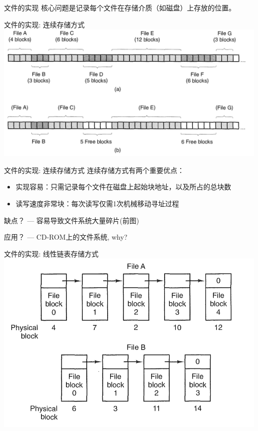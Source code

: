 \documentclass[xcolor=svgnames]{beamer}
\begin{document}
\begin{CJK*}{UTF8}{gbsn}
\begin{frame}{文件的实现}
\alert{核心问题}是记录每个文件在存储介质（如磁盘）上存放的位置。
\end{frame}

\begin{frame}{文件的实现: 连续存储方式}
\includegraphics[width=1.0\textwidth]{cont.png}
\end{frame}

\begin{frame}{文件的实现: 连续存储方式}
连续存储方式有两个重要优点：
\begin{itemize}
\item 实现容易：只需记录每个文件在磁盘上起始块地址，以及所占的总块数
\item 读写速度非常块：每次读写仅需1次机械移动寻址过程
\end{itemize}

\alert{缺点？} --- 容易导致文件系统大量碎片(前图)

\alert{应用？} --- CD-ROM上的文件系统, why?
\end{frame}

\begin{frame}{文件的实现: 线性链表存储方式}
\includegraphics[width=1.0\textwidth]{linked.png}


\end{frame}
\end{CJK*}
\end{document}
